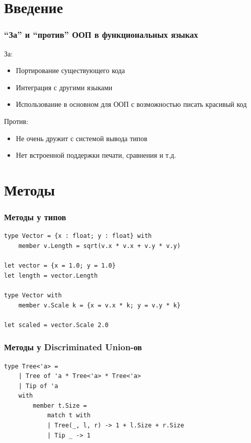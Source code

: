 \documentclass{../../slides-style}
\begin{document}
    
    \begin{frame}[plain]
        \titlepage
    \end{frame}
    
    \section{Введение}

    \begin{frame}
        \frametitle{\enquote{За} и \enquote{против} ООП в функциональных языках}
        За:
        \begin{itemize}
            \item Портирование существующего кода
            \item Интеграция с другими языками
            \item Использование в основном для ООП с возможностью писать красивый код
        \end{itemize}
        
        Против:
        \begin{itemize}
            \item Не очень дружит с системой вывода типов
            \item Нет встроенной поддержки печати, сравнения и т.д.
        \end{itemize}
    \end{frame}
    
    \section{Методы}
    
    \begin{frame}[fragile]
        \frametitle{Методы у типов}
        \begin{verbatim}
type Vector = {x : float; y : float} with
    member v.Length = sqrt(v.x * v.x + v.y * v.y)

let vector = {x = 1.0; y = 1.0}
let length = vector.Length

type Vector with
    member v.Scale k = {x = v.x * k; y = v.y * k}

let scaled = vector.Scale 2.0
        \end{verbatim}
    \end{frame}

    \begin{frame}[fragile]
        \frametitle{Методы у Discriminated Union-ов}
        \begin{verbatim}
type Tree<'a> =
    | Tree of 'a * Tree<'a> * Tree<'a>
    | Tip of 'a
    with
        member t.Size = 
            match t with
            | Tree(_, l, r) -> 1 + l.Size + r.Size
            | Tip _ -> 1
        \end{verbatim}
    \end{frame}
\end{document}
